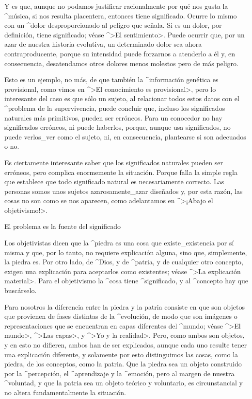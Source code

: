 Y es que, aunque no podamos justificar racionalmente por qué nos gusta
la ^{música}, si nos resulta placentera, entonces tiene significado.
Ocurre lo mismo con un ^{dolor} desproporcionado al peligro que señala.
Si es un dolor, por definición, tiene significado; véase ^>El
sentimiento>. Puede ocurrir que, por un azar de nuestra historia
evolutiva, un determinado dolor sea ahora contraproducente, porque su
intensidad puede forzarnos a atenderlo a él y, en consecuencia,
desatendamos otros dolores menos molestos pero de más peligro.

Esto es un ejemplo, no más, de que también la ^{información} genética es
provisional, como vimos en ^>El conocimiento es provisional>, pero lo
interesante del caso es que sólo un sujeto, al relacionar todos estos
datos con el ^{problema de la supervivencia}, puede concluir que,
incluso los significados naturales más primitivos, pueden ser erróneos.
Para un conocedor no hay significados erróneos, ni puede haberlos,
porque, aunque usa significados, no puede verlos_{ver} como el sujeto,
ni, en consecuencia, plantearse si son adecuados o no.


Es ciertamente interesante saber que los significados naturales pueden
ser erróneos, pero complica enormemente la situación. Porque falla la
simple regla que establece que todo significado natural es
necesariamente correcto. Las personas somos unos sujetos
azarosamente_{azar} diseñados y, por esta razón, las cosas no son como
se nos aparecen, como adelantamos en ^>¡Abajo el objetivismo!>.


\Section El problema es la fuente del significado

Los objetivistas dicen que la ^{piedra} es una cosa que
existe_{existencia} por sí misma y que, por lo tanto, no requiere
explicación alguna, sino que, simplemente, la piedra es. Por otro lado,
de ^{Dios}, y de ^{patria}, y de cualquier otro concepto, exigen una
explicación para aceptarlos como existentes; véase ^>La explicación
material>. Para el objetivismo la ^{cosa} tiene ^{significado}, y al
^{concepto} hay que buscárselo.

Para nosotros la diferencia entre la piedra y la patria consiste en que
son objetos que provienen de fases distintas de la ^{evolución}, de modo
que son imágenes o representaciones que se encuentran en capas
diferentes del ^{mundo}; véase ^>El mundo>, ^>Las capas>, y ^>Yo y la
realidad>. Pero, como ambos son objetos, y en esto no difieren, ambos
han de ser explicados, aunque cada uno resulte tener una explicación
diferente, y solamente por esto distinguimos las cosas, como la piedra,
de los conceptos, como la patria. Que la piedra sea un objeto construido
por la ^{percepción}, el ^{aprendizaje} y la ^{emoción}, pero al margen
de nuestra ^{voluntad}, y que la patria sea un objeto teórico y
voluntario, es circunstancial y no altera fundamentalmente la situación.

